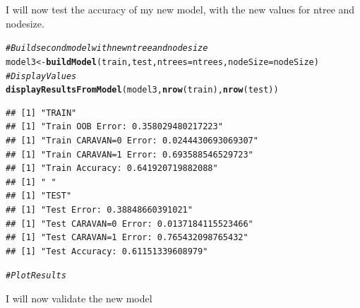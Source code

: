 \documentclass{article}\usepackage[]{graphicx}\usepackage[]{color}
\makeatletter
\newcommand{\hlcom}[1]{\textcolor[rgb]{0.678,0.584,0.686}{\textit{#1}}}%
\newcommand{\hlstd}[1]{\textcolor[rgb]{0.345,0.345,0.345}{#1}}%
\newcommand{\hlkwb}[1]{\textcolor[rgb]{0.69,0.353,0.396}{#1}}%
\newcommand{\hlkwc}[1]{\textcolor[rgb]{0.333,0.667,0.333}{#1}}%
\newcommand{\hlkwd}[1]{\textcolor[rgb]{0.737,0.353,0.396}{\textbf{#1}}}%
\newenvironment{kframe}{%
 \def\at@end@of@kframe{}%
 \ifinner\ifhmode%
  \def\at@end@of@kframe{\end{minipage}}%
  \begin{minipage}{\columnwidth}%
 \fi\fi%
 \def\FrameCommand##1{\hskip\@totalleftmargin \hskip-\fboxsep
 \colorbox{shadecolor}{##1}\hskip-\fboxsep
     \hskip-\linewidth \hskip-\@totalleftmargin \hskip\columnwidth}%
 \MakeFramed {\advance\hsize-\width
   \@totalleftmargin\z@ \linewidth\hsize
   \@setminipage}}%
 {\par\unskip\endMakeFramed%
 \at@end@of@kframe}
\newenvironment{knitrout}{}{} %
\makeatother
\begin{document}
I will now test the accuracy of my new model, with the new values for ntree and nodesize.
\begin{knitrout}
\color{fgcolor}\begin{kframe}
\begin{alltt}
\hlcom{#Build second model with new ntree and nodesize}
\hlstd{model3}\hlkwb{<-}\hlkwd{buildModel}\hlstd{(train,test,}\hlkwc{ntrees}\hlstd{=ntrees,}\hlkwc{nodeSize}\hlstd{=nodeSize)}
\hlcom{#Display Values}
\hlkwd{displayResultsFromModel}\hlstd{(model3,}\hlkwd{nrow}\hlstd{(train),}\hlkwd{nrow}\hlstd{(test))}
\end{alltt}
\begin{verbatim}
## [1] "TRAIN"
## [1] "Train OOB Error: 0.358029480217223"
## [1] "Train CARAVAN=0 Error: 0.0244430693069307"
## [1] "Train CARAVAN=1 Error: 0.693588546529723"
## [1] "Train Accuracy: 0.641920719882088"
## [1] " "
## [1] "TEST"
## [1] "Test Error: 0.38848660391021"
## [1] "Test CARAVAN=0 Error: 0.0137184115523466"
## [1] "Test CARAVAN=1 Error: 0.765432098765432"
## [1] "Test Accuracy: 0.61151339608979"
\end{verbatim}
\begin{alltt}
\hlcom{#Plot Results}
\end{alltt}
\end{kframe}
\end{knitrout}
I will now validate the new model
\end{document}
